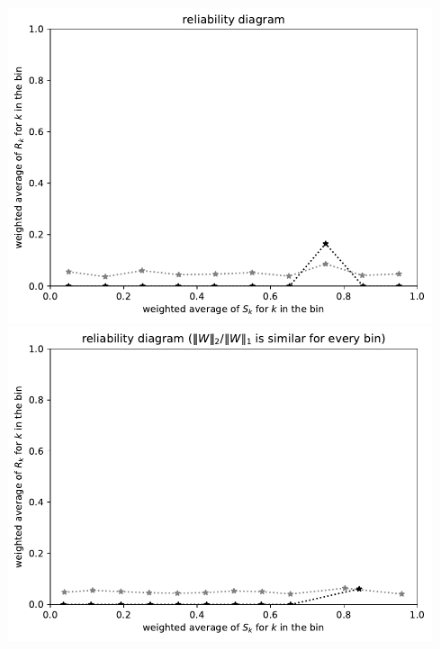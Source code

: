\documentclass{article}
\begin{document}
\begin{figure}
\begin{centering}
\vspace{\vertsep}

\parbox{\imsize}{\includegraphics[width=\imsize]
                 {./codes/weighted/50000_2500_10_3/equiscores.pdf}}
\quad\quad
\parbox{\imsize}{\includegraphics[width=\imsize]
                 {./codes/weighted/50000_2500_10_3/equierrs.pdf}}

\vspace{\vertsep}


\end{centering}
\end{figure}
\end{document}
